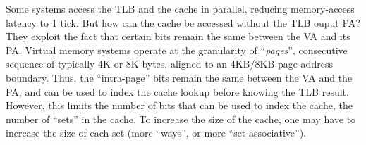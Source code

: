 Some systems access the TLB and the cache in parallel, reducing
memory-access latency to 1 tick.  But how can the cache be accessed
without the TLB ouput PA?  They exploit the fact that certain bits
remain the same between the VA and its PA.  Virtual memory systems
operate at the granularity of ``\emph{pages}'', consecutive sequence
of typically 4K or 8K bytes, aligned to an 4KB/8KB page address
boundary.  Thus, the ``intra-page'' bits remain the same between the
VA and the PA, and can be used to index the cache lookup before
knowing the TLB result.  However, this limits the number of bits that
can be used to index the cache, {\ie} the number of ``sets'' in the
cache.  To increase the size of the cache, one may have to increase
the size of each set (more ``ways'', or more ``set-associative'').

